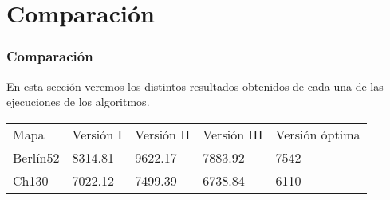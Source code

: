 \documentclass{beamer}
\begin{document}
\section{Comparación}
\begin{frame}
	\frametitle{Comparación}
	En esta sección veremos los distintos resultados obtenidos de cada una de las ejecuciones de los algoritmos.
	
	\begin{table}[H]
		\centering
	
		
		\begin{tabular}{l|l|l|l|l}
		  Mapa	& Versión I & Versión II & Versión III  & Versión óptima  \\
		Berlín52	&  8314.81  &9622.17  & 7883.92 & 7542  \\
		Ch130	& 7022.12   & 7499.39  & 6738.84 & 6110  \\
 
		\end{tabular}
	
	\end{table}
	
\end{frame}
\end{document}
